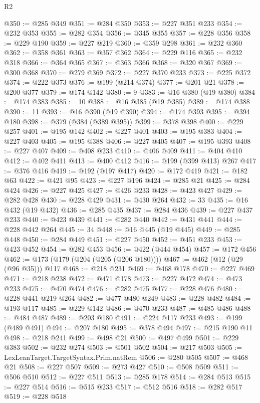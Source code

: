 \begin{lexlean}{R2}
\begin{coremodule}
@350 := @285 @349
@351 := @284 @350
@353 := @227 @351 @233
@354 := @232 @353
@355 := @282 @354
@356 := @345 @355
@357 := @228 @356
@358 := @229 @190
@359 := @227 @219
@360 := @359 @298
@361 := @232 @360
@362 := @358 @361
@363 := @357 @362
@364 := @229 @116
@365 := @232 @318
@366 := @364 @365
@367 := @363 @366
@368 := @320 @367
@369 := @300 @368
@370 := @279 @369
@372 := @227 @370 @233
@373 := @225 @372
@374 := @222 @373
@376 := @199 (@214 @374)
@377 := @201 @21
@378 := @200 @377
@379 := @174 @142
@380 := 9
@383 := @16 @380 (@19 @380)
@384 := @174 @383
@385 := 10
@388 := @16 @385 (@19 @385)
@389 := @174 @388
@390 := 11
@393 := @16 @390 (@19 @390)
@394 := @174 @393
@395 := @394 @180
@398 := @379 (@384 (@389 @395))
@399 := @378 @398
@400 := @229 @257
@401 := @195 @142
@402 := @227 @401
@403 := @195 @383
@404 := @227 @403
@405 := @195 @388
@406 := @227 @405
@407 := @195 @393
@408 := @227 @407
@409 := @408 @233
@410 := @406 @409
@411 := @404 @410
@412 := @402 @411
@413 := @400 @412
@416 := @199 (@399 @413) @267
@417 := @376 @416
@419 := @192 (@197 @417)
@420 := @172 @419
@421 := @182 @63
@422 := @421 @95
@423 := @227 @196
@424 := @285 @21
@425 := @284 @424
@426 := @227 @425
@427 := @426 @233
@428 := @423 @427
@429 := @282 @428
@430 := @228 @429
@431 := @430 @264
@432 := 33
@435 := @16 @432 (@19 @432)
@436 := @285 @435
@437 := @284 @436
@439 := @227 @437 @233
@440 := @423 @439
@441 := @282 @440
@442 := @431 @441
@444 := @228 @442 @264
@445 := 34
@448 := @16 @445 (@19 @445)
@449 := @285 @448
@450 := @284 @449
@451 := @227 @450
@452 := @451 @233
@453 := @423 @452
@454 := @282 @453
@456 := @422 (@444 @454)
@457 := @172 @456
@462 := @173 (@179 (@204 (@205 (@206 @180))))
@467 := @462 (@12 (@29 (@96 @35))) @117
@468 := @218 @231
@469 := @468 @178
@470 := @227 @469
@471 := @218 @238
@472 := @471 @178
@473 := @227 @472
@474 := @473 @233
@475 := @470 @474
@476 := @282 @475
@477 := @228 @476
@480 := @228 @441 @219 @264
@482 := @477 @480 @249
@483 := @228 @482
@484 := @193 @117
@485 := @229 @142
@486 := @470 @233
@487 := @485 @486
@488 := @484 @487
@489 := @203 @180
@491 := @224 @117 @233
@493 := @199 (@489 @491)
@494 := @207 @180
@495 := @378 @494
@497 := @215 @190 @11
@498 := @218 @241
@499 := @498 @21
@500 := @497 @499
@501 := @229 @383
@502 := @232 @274
@503 := @501 @502
@504 := @217 @503
@505 := LexLeanTarget.TargetSyntax.Prim.natRem
@506 := @280 @505
@507 := @468 @21
@508 := @227 @507
@509 := @273 @427
@510 := @508 @509
@511 := @506 @510
@512 := @227 @511
@513 := @285 @178
@514 := @284 @513
@515 := @227 @514
@516 := @515 @233
@517 := @512 @516
@518 := @282 @517
@519 := @228 @518

\end{coremodule}
\end{lexlean}
